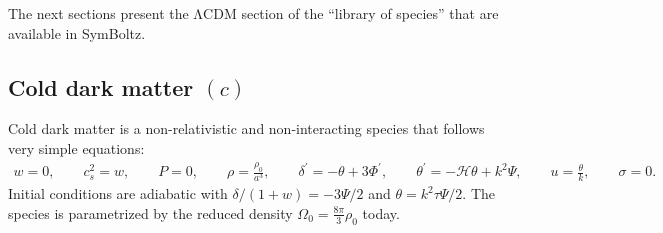 \documentclass{aa}
\newcommand{\LCDM}{$\mathrm{\Lambda C D M}$}
\newcommand\scrH{\mathscr{H}}
\begin{document}
The next sections present the \LCDM{} section of the \enquote{library of species} that are available in SymBoltz.

\subsection{Cold dark matter \texorpdfstring{$(c)$}{(c)}}
\label{sec:cdm}
Cold dark matter is a non-relativistic and non-interacting species that follows very simple equations:
\begin{align*}
w = 0 , \qquad
{c_s^2} = w , \qquad
P = 0 , \qquad
\rho = \frac{\rho_0}{a^{3}} , \qquad
\delta^\prime = - \theta + 3 \Phi^\prime , \qquad
\theta^\prime = - \scrH \theta + k^{2} \Psi , \qquad
u = \frac{\theta}{k} , \qquad
\sigma = 0 .
\end{align*}
Initial conditions are adiabatic with $\delta/(1+w) = -3 \Psi / 2$ and $\theta = k^2 \tau \Psi / 2$.
The species is parametrized by the reduced density $\Omega_0 = \frac{8\pi}{3}\rho_0$ today.
\end{document}
